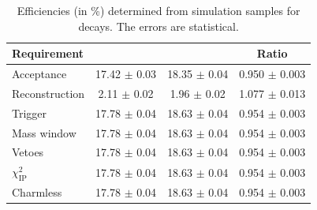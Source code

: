 \begin{table}[h]
\centering
\begin{tabular}{ l c c c }

\hline
Requirement             & \decay{\Bp}{\Dsp\phiz}   & \decay{\Bp}{\Dsp\Dzb} & Ratio \\ 
\hline
Acceptance              & 17.42 $\pm$ 0.03         & 18.35 $\pm$ 0.04      & 0.950 $\pm$ 0.003  \\
Reconstruction          &  2.11 $\pm$ 0.02         &  1.96 $\pm$ 0.02      & 1.077 $\pm$ 0.013  \\
Trigger                 & 17.78 $\pm$ 0.04         & 18.63 $\pm$ 0.04      & 0.954 $\pm$ 0.003  \\
Mass window             & 17.78 $\pm$ 0.04         & 18.63 $\pm$ 0.04      & 0.954 $\pm$ 0.003  \\
Vetoes                  & 17.78 $\pm$ 0.04         & 18.63 $\pm$ 0.04      & 0.954 $\pm$ 0.003  \\
$\chi^{2}_{\text{IP}}$  & 17.78 $\pm$ 0.04         & 18.63 $\pm$ 0.04      & 0.954 $\pm$ 0.003  \\
Charmless               & 17.78 $\pm$ 0.04         & 18.63 $\pm$ 0.04      & 0.954 $\pm$ 0.003  \\
\hline
\end{tabular}
\caption{Efficiencies (in \%) determined from simulation samples for \decay{\Dsp}{\Kp\Km\pip} decays.
The errors are statistical.} 
\label{tab:B2DsPhi_eff_KKPi} 
\end{table}



